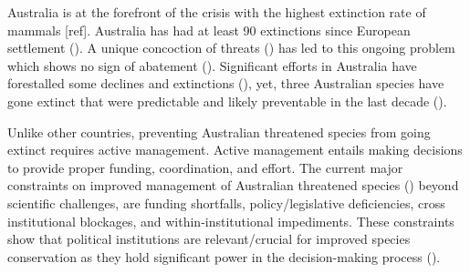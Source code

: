\documentclass[a4paper,11pt]{article}
\begin{document}

Australia is at the forefront of the crisis with the highest extinction rate of mammals [ref]. Australia has had at least 90 extinctions since European settlement (\cite{commonwealthofaustraliaSpeciesProfileThreats2021}). A unique concoction of threats (\cite{kearneyThreatsAustraliaImperilled2019}) has led to this ongoing problem which shows no sign of abatement (\cite{simmondsVulnerableSpeciesEcosystems2020,wardLotsLossLittle2019,resideHowSendFinch2019}). Significant efforts in Australia have forestalled some declines and extinctions (\cite{kearneyThreatsAustraliaImperilled2019}), yet, three Australian species have gone extinct that were predictable and likely preventable in the last decade (\cite{woinarskiContributionPolicyLaw2017}).

Unlike other countries, preventing Australian threatened species from going extinct requires active management. Active management entails making decisions to provide proper funding, coordination, and effort. The current major constraints on improved management of Australian threatened species (\cite{leggeMonitoringThreatenedSpecies2018, wintleSpendingWhatWill2019, simmondsVulnerableSpeciesEcosystems2020,kearneyThreatsAustraliaImperilled2019,woinarskiReadingBlackBook2019,wardLotsLossLittle2019}) beyond scientific challenges, are funding shortfalls, policy/legislative deficiencies, cross institutional blockages, and within-institutional impediments. These constraints show that political institutions are relevant/crucial for improved species conservation as they hold significant power in the decision-making process (\cite{rydenLinkingDemocracyBiodiversity2020}).
\end{document}
